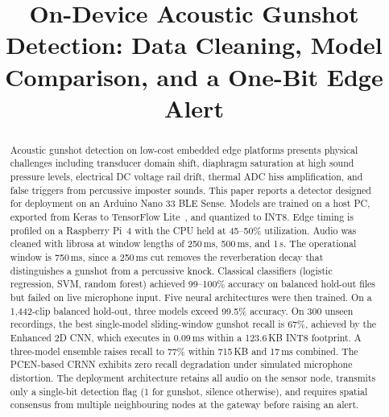 \documentclass[conference]{IEEEtran}
\begin{document}
\title{On-Device Acoustic Gunshot Detection: Data Cleaning, Model Comparison, and a One-Bit Edge Alert}

\author{
}

\maketitle

\begin{abstract}
Acoustic gunshot detection on low-cost embedded edge platforms presents physical challenges including transducer domain shift, diaphragm saturation at high sound pressure levels, electrical DC voltage rail drift, thermal ADC hiss amplification, and false triggers from percussive imposter sounds. This paper reports a detector designed for deployment on an Arduino Nano 33 BLE Sense. Models are trained on a host PC, exported from Keras to TensorFlow Lite~\cite{david2021}, and quantized to INT8. Edge timing is profiled on a Raspberry Pi~4 with the CPU held at 45--50\% utilization. Audio was cleaned with librosa at window lengths of 250\,ms, 500\,ms, and 1\,s. The operational window is 750\,ms, since a 250\,ms cut removes the reverberation decay that distinguishes a gunshot from a percussive knock. Classical classifiers (logistic regression, SVM, random forest) achieved 99--100\% accuracy on balanced hold-out files but failed on live microphone input. Five neural architectures were then trained. On a 1{,}442-clip balanced hold-out, three models exceed 99.5\% accuracy. On 300 unseen recordings, the best single-model sliding-window gunshot recall is 67\%, achieved by the Enhanced 2D CNN, which executes in 0.09\,ms within a 123.6\,KB INT8 footprint. A three-model ensemble raises recall to 77\% within 715\,KB and 17\,ms combined. The PCEN-based CRNN exhibits zero recall degradation under simulated microphone distortion. The deployment architecture retains all audio on the sensor node, transmits only a single-bit detection flag (1 for gunshot, silence otherwise), and requires spatial consensus from multiple neighbouring nodes at the gateway before raising an alert.
\end{abstract}
\end{document}
